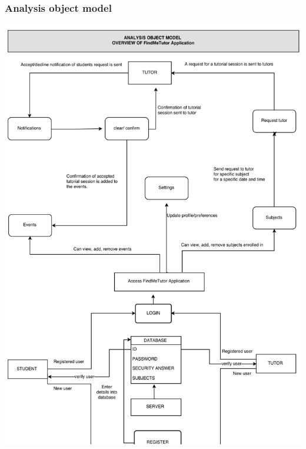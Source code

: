 \documentclass[12pt]{article}
\begin{document}
{\subsubsection{Analysis object model}
\includegraphics[width=140mm]{./Sprint3Models/Analysis_Object_model3.png}



}
\end{document}
